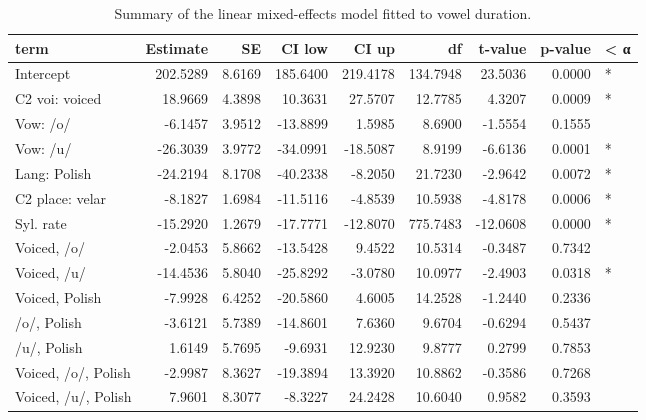 \documentclass[preprint]{JASAnew}
\begin{document}
\begin{table}

\caption{\label{tab:vow-table}Summary of the linear mixed-effects model fitted to vowel duration.}
\centering
\begin{tabular}[t]{lrrrrrrrl}
\toprule
term & Estimate & SE & CI low & CI up & df & t-value & p-value & < α\\
\midrule
Intercept & 202.5289 & 8.6169 & 185.6400 & 219.4178 & 134.7948 & 23.5036 & 0.0000 & *\\
C2 voi: voiced & 18.9669 & 4.3898 & 10.3631 & 27.5707 & 12.7785 & 4.3207 & 0.0009 & *\\
Vow: /o/ & -6.1457 & 3.9512 & -13.8899 & 1.5985 & 8.6900 & -1.5554 & 0.1555 & \\
Vow: /u/ & -26.3039 & 3.9772 & -34.0991 & -18.5087 & 8.9199 & -6.6136 & 0.0001 & *\\
Lang: Polish & -24.2194 & 8.1708 & -40.2338 & -8.2050 & 21.7230 & -2.9642 & 0.0072 & *\\
\addlinespace
C2 place: velar & -8.1827 & 1.6984 & -11.5116 & -4.8539 & 10.5938 & -4.8178 & 0.0006 & *\\
Syl. rate & -15.2920 & 1.2679 & -17.7771 & -12.8070 & 775.7483 & -12.0608 & 0.0000 & *\\
Voiced, /o/ & -2.0453 & 5.8662 & -13.5428 & 9.4522 & 10.5314 & -0.3487 & 0.7342 & \\
Voiced, /u/ & -14.4536 & 5.8040 & -25.8292 & -3.0780 & 10.0977 & -2.4903 & 0.0318 & *\\
Voiced, Polish & -7.9928 & 6.4252 & -20.5860 & 4.6005 & 14.2528 & -1.2440 & 0.2336 & \\
\addlinespace
/o/, Polish & -3.6121 & 5.7389 & -14.8601 & 7.6360 & 9.6704 & -0.6294 & 0.5437 & \\
/u/, Polish & 1.6149 & 5.7695 & -9.6931 & 12.9230 & 9.8777 & 0.2799 & 0.7853 & \\
Voiced, /o/, Polish & -2.9987 & 8.3627 & -19.3894 & 13.3920 & 10.8862 & -0.3586 & 0.7268 & \\
Voiced, /u/, Polish & 7.9601 & 8.3077 & -8.3227 & 24.2428 & 10.6040 & 0.9582 & 0.3593 & \\
\bottomrule
\end{tabular}
\end{table}
\end{document}
